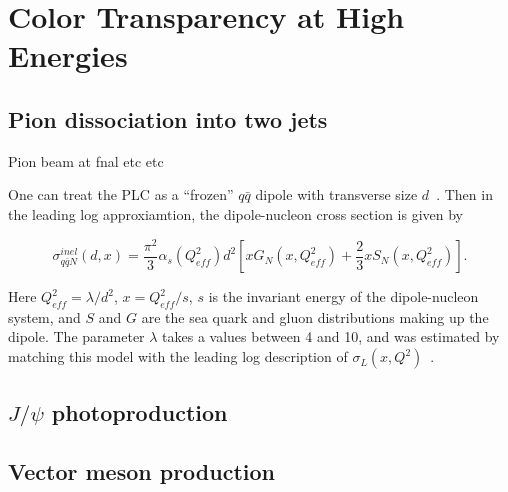 \section{Color Transparency at High Energies}
\label{sec:ct_high_energies}
\subsection{Pion dissociation into two jets}
Pion beam at fnal etc etc

One can treat the PLC as a ``frozen'' $q\bar{q}$ dipole with transverse 
size $d$~\cite{Blattel_1993, Frankfurt_1993}.
Then in the leading log approxiamtion, the dipole-nucleon cross section is 
given by~\cite{Frankfurt_2000, Frankfurt_2002}

\begin{equation}
    \sigma_{q\bar{q} N}^{inel}(d,x) = \frac{\pi^{2}}{3} \alpha_{s}
    \left( Q_{eff}^2 \right) d^2
    \left[
           x G_{N} \left( x, Q_{eff}^2 \right) +
           \frac{2}{3} x S_{N} \left( x, Q_{eff}^2 \right)
    \right].
\end{equation}

Here $Q_{eff}^2=\lambda/d^2$, $x=Q_{eff}^2/s$, $s$ is the invariant energy of
the dipole-nucleon system, and $S$ and $G$ are the sea quark and gluon
distributions making up the dipole.
The parameter $\lambda$ takes a values between 4 and 10, and was estimated by
matching this model with the leading log description of
$\sigma_L(x,Q^2)$~\cite{Frankfurt_1996}.

\subsection{$J/\psi$ photoproduction}

\subsection{Vector meson production}
